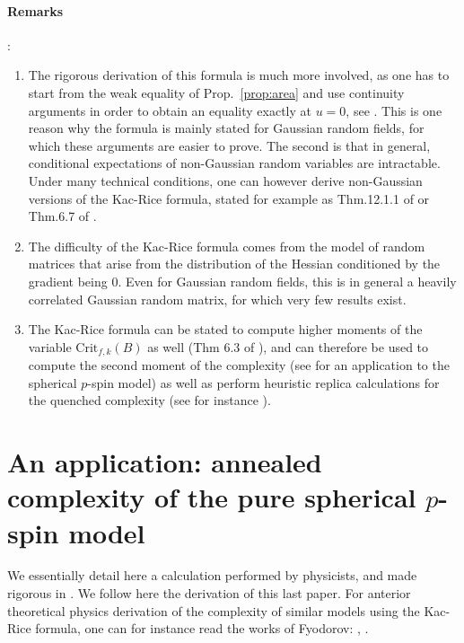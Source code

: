 \documentclass[amsmath,amssymb,nofootinbib,prd]{article}
\begin{document}
	\paragraph{Remarks}:
	\begin{enumerate}
	\item The rigorous derivation of this formula is much more involved, as one has to start from the weak equality of Prop.~\ref{prop:area} and use continuity arguments in order to obtain an equality exactly at $u = 0$, see \cite{azais2009level}. This is one reason why the formula is mainly stated for Gaussian random fields, for which these arguments are easier to prove. The second is that in general, conditional expectations of non-Gaussian random variables are intractable. Under many technical conditions, one can however derive non-Gaussian versions of the Kac-Rice formula, stated for example as Thm.12.1.1 of \cite{adler2009random} or Thm.6.7 of \cite{azais2009level}. 
	\item The difficulty of the Kac-Rice formula comes from the model of random matrices that arise from the distribution of the Hessian conditioned by the gradient being $0$. Even for Gaussian random fields, this is in general a heavily correlated Gaussian random matrix, for which very few results exist. 
	\item The Kac-Rice formula can be stated to compute higher moments of the variable $\mathrm{Crit}_{f,k}(B)$ as well (Thm 6.3 of \cite{azais2009level}), and can therefore be used to compute the second moment of the complexity (see \cite{subag2017complexity} for an application to the spherical $p$-spin model) as well as perform heuristic replica calculations for the quenched complexity (see for instance \cite{ros2019complex}). 
	\end{enumerate}
	
	\section{An application: annealed complexity of the pure spherical $p$-spin model}
	
	We essentially detail here a calculation performed by physicists, and made rigorous in \cite{auffinger2013random}. We follow here the derivation of this last paper. For anterior theoretical physics derivation of the complexity of similar models using the Kac-Rice formula, one can for instance read the works of Fyodorov: \cite{fyodorov2004complexity}, \cite{fyodorov2007replica}. 
	
\end{document}
